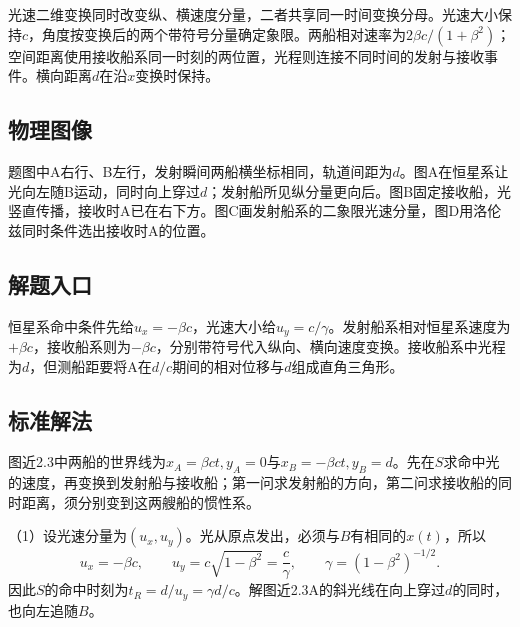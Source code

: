\documentclass[UTF8,fontset=fandol,a4paper,11pt]{ctexart}
\begin{document}
光速二维变换同时改变纵、横速度分量，二者共享同一时间变换分母。光速大小保持$c$，角度按变换后的两个带符号分量确定象限。两船相对速率为$2\beta c/(1+\beta^2)$；空间距离使用接收船系同一时刻的两位置，光程则连接不同时间的发射与接收事件。横向距离$d$在沿$x$变换时保持。



\subsection*{物理图像}

题图中A右行、B左行，发射瞬间两船横坐标相同，轨道间距为$d$。图A在恒星系让光向左随B运动，同时向上穿过$d$；发射船所见纵分量更向后。图B固定接收船，光竖直传播，接收时A已在右下方。图C画发射船系的二象限光速分量，图D用洛伦兹同时条件选出接收时A的位置。



\subsection*{解题入口}

恒星系命中条件先给$u_x=-\beta c$，光速大小给$u_y=c/\gamma$。发射船系相对恒星系速度为$+\beta c$，接收船系则为$-\beta c$，分别带符号代入纵向、横向速度变换。接收船系中光程为$d$，但测船距要将A在$d/c$期间的相对位移与$d$组成直角三角形。



\subsection*{标准解法}


图近2.3中两船的世界线为$x_A=\beta ct,y_A=0$与$x_B=-\beta ct,y_B=d$。先在$S$求命中光的速度，再变换到发射船与接收船；第一问求发射船的方向，第二问求接收船的同时距离，须分别变到这两艘船的惯性系。

（1）设光速分量为$(u_x,u_y)$。光从原点发出，必须与$B$有相同的$x(t)$，所以
\[
u_x=-\beta c,\qquad
u_y=c\sqrt{1-\beta^2}=\frac c\gamma,
\qquad \gamma=(1-\beta^2)^{-1/2}.
\]
因此$S$的命中时刻为$t_R=d/u_y=\gamma d/c$。解图近2.3A的斜光线在向上穿过$d$的同时，也向左追随$B$。
\end{document}
